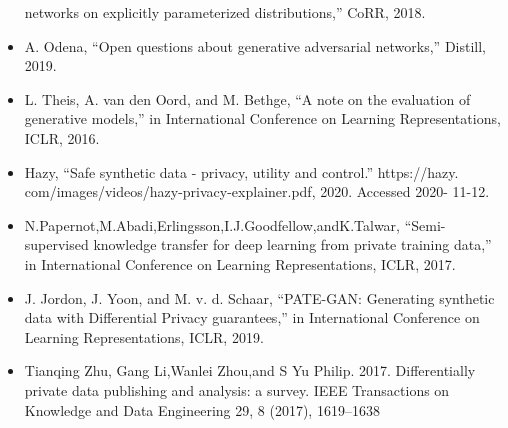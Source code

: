 \documentclass[11pt]{article}
\begin{document}
\begin{itemize}
        networks on explicitly parameterized distributions,” CoRR, 2018.
        \item A. Odena, “Open questions about generative adversarial networks,”
        Distill, 2019.
        \item L. Theis, A. van den Oord, and M. Bethge, “A note on the evaluation
        of generative models,” in International Conference on Learning Representations, ICLR, 2016.
        \item Hazy, “Safe synthetic data - privacy, utility and control.” https://hazy.
        com/images/videos/hazy-privacy-explainer.pdf, 2020. Accessed 2020-
        11-12.
        \item N.Papernot,M.Abadi,Erlingsson,I.J.Goodfellow,andK.Talwar, “Semi-supervised knowledge transfer for deep learning from private training data,” in International Conference on Learning Representations, ICLR, 2017.
        \item J. Jordon, J. Yoon, and M. v. d. Schaar, “PATE-GAN: Generating synthetic data with Differential Privacy guarantees,” in International Conference on Learning Representations, ICLR, 2019.
        \item Tianqing Zhu, Gang Li,Wanlei Zhou,and S Yu Philip. 2017. Differentially private data publishing and analysis: a survey. IEEE Transactions on Knowledge and Data  Engineering 29, 8 (2017), 1619–1638
    \end{itemize}
\end{document}
